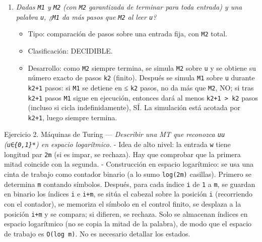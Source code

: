\documentclass[12pt]{book} %
\providecommand{\tightlist}{%
  \setlength{\itemsep}{0pt}\setlength{\parskip}{0pt}}
\begin{document}
\begin{enumerate}
  \begin{itemize}
  \tightlist
  \item
    Tipo: condición universal con aceptación de \texttt{M1}
    (semidecidible) en el antecedente.
  \item
    Clasificación: NO SEMIDECIDIBLE.
  \item
    Desarrollo: el complementario sí es semidecidible: para refutar la
    afirmación basta encontrar una palabra \texttt{w} (≤100) que
    \texttt{M1} acepte en \texttt{k1} pasos y que \texttt{M2} no acepte
    en ≤ \texttt{k1} pasos; esto se busca por dovetailing (al aceptar
    \texttt{M1} se conoce \texttt{k1} y se simula \texttt{M2} durante
    \texttt{k1} pasos). Como el complementario es r.e., la afirmación es
    co-r.e.; y no es r.e., porque su verdad incluye casos en que
    \texttt{M1} cicla sobre alguna \texttt{w} (antecedente falso, no
    confirmable). Por tanto, no es semidecidible.
  \end{itemize}
\item
  \emph{Dadas \texttt{M1} y \texttt{M2} (con \texttt{M2} garantizada de
  terminar para toda entrada) y una palabra \texttt{u}, ¿\texttt{M1} da
  más pasos que \texttt{M2} al leer \texttt{u}?}

  \begin{itemize}
  \tightlist
  \item
    Tipo: comparación de pasos sobre una entrada fija, con \texttt{M2}
    total.
  \item
    Clasificación: DECIDIBLE.
  \item
    Desarrollo: como \texttt{M2} siempre termina, se simula \texttt{M2}
    sobre \texttt{u} y se obtiene su número exacto de pasos \texttt{k2}
    (finito). Después se simula \texttt{M1} sobre \texttt{u} durante
    \texttt{k2+1} pasos: si \texttt{M1} se detiene en ≤ \texttt{k2}
    pasos, no da más que \texttt{M2}, NO; si tras \texttt{k2+1} pasos
    \texttt{M1} sigue en ejecución, entonces dará al menos
    \texttt{k2+1\ \textgreater{}\ k2} pasos (incluso si cicla
    indefinidamente), SÍ. La simulación está acotada por \texttt{k2+1},
    luego siempre termina.
  \end{itemize}
\end{enumerate}

Ejercicio 2. Máquinas de Turing --- \emph{Describir una MT que reconozca
\texttt{uu} (\texttt{u∈\{0,1\}*}) en espacio logarítmico.} - Idea de
alto nivel: la entrada \texttt{w} tiene longitud par \texttt{2m} (si es
impar, se rechaza). Hay que comprobar que la primera mitad coincide con
la segunda. - Construcción en espacio logarítmico: se usa una cinta de
trabajo como contador binario (a lo sumo \texttt{log(2m)} casillas).
Primero se determina \texttt{m} contando símbolos. Después, para cada
índice \texttt{i} de \texttt{1} a \texttt{m}, se guardan en binario los
índices \texttt{i} e \texttt{i+m}, se sitúa el cabezal sobre la posición
\texttt{i} (recorriendo con el contador), se memoriza el símbolo en el
control finito, se desplaza a la posición \texttt{i+m} y se compara; si
difieren, se rechaza. Solo se almacenan índices en espacio logarítmico
(no se copia la mitad de la palabra), de modo que el espacio de trabajo
es \texttt{O(log\ m)}. No es necesario detallar los estados.
\end{document}
